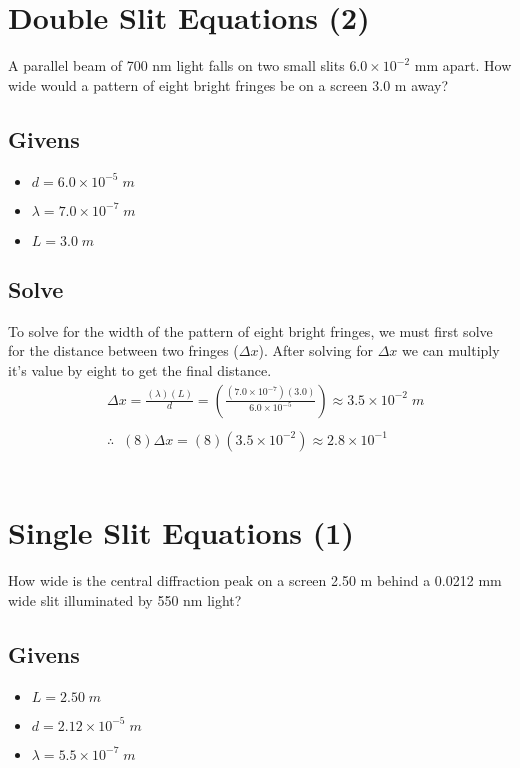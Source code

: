 \documentclass{article}
\begin{document}
\section{Double Slit Equations (2)}
A parallel beam of 700 nm light falls on two small slits $6.0 \times 10^{-2}$ mm apart. How wide would a pattern of eight bright fringes be on a screen 3.0 m away?
\subsection*{Givens}
\begin{itemize}
    \item $d = 6.0 \times 10^{-5}\;m$
    \item $\lambda = 7.0 \times 10^{-7}\;m$
    \item $L = 3.0\;m$
\end{itemize}\leavevmode

\subsection*{Solve}
To solve for the width of the pattern of eight bright fringes, we must first solve for the distance between two fringes ($\Delta x$). After solving for $\Delta x$ we can multiply it's value by eight to get the final distance.\\
\begin{align*}
     & \Delta x = \frac{(\lambda)(L)}{d} = \left(\frac{(7.0 \times 10^{-7})(3.0)}{6.0 \times 10^{-5}}\right) \approx 3.5 \times 10^{-2}\;m \\\\
     & \therefore\;\;(8)\Delta x = (8)(3.5 \times 10^{-2}) \approx 2.8 \times 10^{-1}
\end{align*}\leavevmode\\



\section{Single Slit Equations (1)}
How wide is the central diffraction peak on a screen 2.50 m behind a 0.0212 mm wide slit illuminated by 550 nm light?
\subsection*{Givens}
\begin{itemize}
    \item $L = 2.50\;m$
    \item $d = 2.12 \times 10^{-5}\;m$
    \item $\lambda = 5.5 \times 10^{-7}\;m$
\end{itemize}\leavevmode
\end{document}
